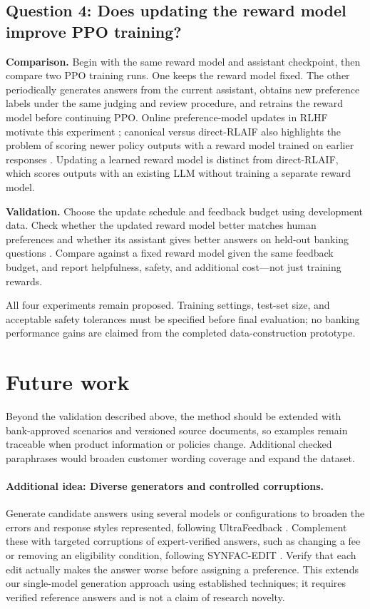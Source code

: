 \documentclass[11pt]{article}
\begin{document}
\subsection{Question 4: Does updating the reward model improve PPO training?}
\textbf{Comparison.} Begin with the same reward model and assistant checkpoint, then compare two PPO training runs. One keeps the reward model fixed. The other periodically generates answers from the current assistant, obtains new preference labels under the same judging and review procedure, and retrains the reward model before continuing PPO. Online preference-model updates in RLHF motivate this experiment \cite{rlhf}; canonical versus direct-RLAIF also highlights the problem of scoring newer policy outputs with a reward model trained on earlier responses \cite{rlaif}. Updating a learned reward model is distinct from direct-RLAIF, which scores outputs with an existing LLM without training a separate reward model.

\textbf{Validation.} Choose the update schedule and feedback budget using development data. Check whether the updated reward model better matches human preferences and whether its assistant gives better answers on held-out banking questions \cite{west}. Compare against a fixed reward model given the same feedback budget, and report helpfulness, safety, and additional cost---not just training rewards.

All four experiments remain proposed. Training settings, test-set size, and acceptable safety tolerances must be specified before final evaluation; no banking performance gains are claimed from the completed data-construction prototype.

\section{Future work}
Beyond the validation described above, the method should be extended with bank-approved scenarios and versioned source documents, so examples remain traceable when product information or policies change. Additional checked paraphrases would broaden customer wording coverage and expand the dataset.

\paragraph{Additional idea: Diverse generators and controlled corruptions.}
Generate candidate answers using several models or configurations to broaden the errors and response styles represented, following UltraFeedback \cite{ultra}. Complement these with targeted corruptions of expert-verified answers, such as changing a fee or removing an eligibility condition, following SYNFAC-EDIT \cite{synfac}. Verify that each edit actually makes the answer worse before assigning a preference. This extends our single-model generation approach using established techniques; it requires verified reference answers and is not a claim of research novelty.
\end{document}
